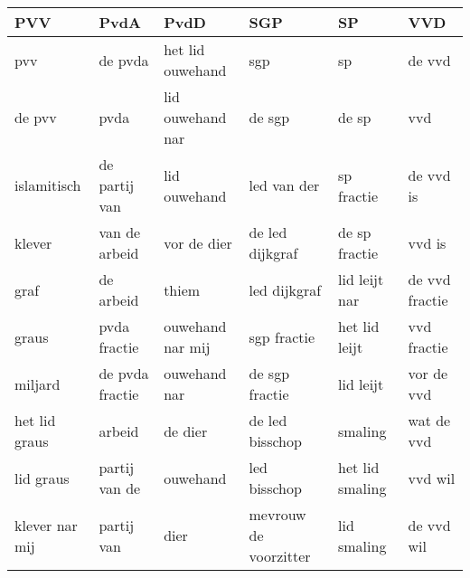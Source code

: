 \begin{tabular}{llllll}
\toprule
            PVV &             PvdA &              PvdD &                    SGP &               SP &             VVD \\
\midrule
            pvv &          de pvda &  het lid ouwehand &                    sgp &               sp &          de vvd \\
         de pvv &             pvda &  lid ouwehand nar &                 de sgp &            de sp &             vvd \\
    islamitisch &    de partij van &      lid ouwehand &            led van der &       sp fractie &       de vvd is \\
         klever &    van de arbeid &       vor de dier &        de led dijkgraf &    de sp fractie &          vvd is \\
           graf &        de arbeid &             thiem &           led dijkgraf &    lid leijt nar &  de vvd fractie \\
          graus &     pvda fractie &  ouwehand nar mij &            sgp fractie &    het lid leijt &     vvd fractie \\
        miljard &  de pvda fractie &      ouwehand nar &         de sgp fractie &        lid leijt &      vor de vvd \\
  het lid graus &           arbeid &           de dier &        de led bisschop &          smaling &      wat de vvd \\
      lid graus &    partij van de &          ouwehand &           led bisschop &  het lid smaling &         vvd wil \\
 klever nar mij &       partij van &              dier &  mevrouw de voorzitter &      lid smaling &      de vvd wil \\
\bottomrule
\end{tabular}
